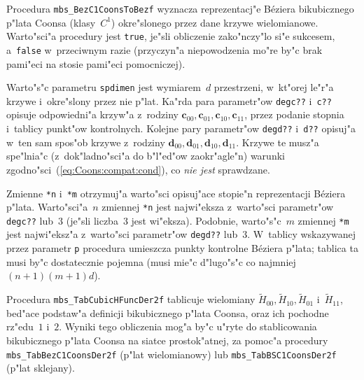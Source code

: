 \vspace{\bigskipamount}
Procedura \texttt{mbs\_BezC1CoonsToBezf} wyznacza reprezentacj"e B\'{e}ziera
bikubicznego p"lata Coonsa (klasy~$C^1$) okre"slonego przez dane krzywe
wielomianowe. Warto"sci"a procedury jest \texttt{true}, je"sli obliczenie
zako"nczy"lo si"e sukcesem, a~\texttt{false} w~przeciwnym razie (przyczyn"a
niepowodzenia mo"re by"c brak pami"eci na stosie pami"eci pomocniczej).

Warto"s"c parametru \texttt{spdimen} jest wymiarem~$d$ przestrzeni, w~kt"orej
le"r"a krzywe i~okre"slony przez nie p"lat. Ka"rda para parametr"ow
\texttt{degc??} i~\texttt{c??} opisuje odpowiedni"a krzyw"a z~rodziny
$\bm{c}_{00},\bm{c}_{01},\bm{c}_{10},\bm{c}_{11}$, przez podanie stopnia
i~tablicy punkt"ow kontrolnych. Kolejne pary parametr"ow \texttt{degd??}
i~\texttt{d??} opisuj"a w~ten sam spos"ob krzywe z~rodziny
$\bm{d}_{00},\bm{d}_{01},\bm{d}_{10},\bm{d}_{11}$. Krzywe te musz"a
spe"lnia"c (z~dok"ladno"sci"a do b"l"ed"ow zaokr"agle"n) warunki
zgodno"sci~(\ref{eq:Coons:compat:cond}), co \emph{nie jest} sprawdzane.

Zmienne \texttt{*n} i~\texttt{*m} otrzymuj"a warto"sci opisuj"ace stopie"n
reprezentacji B\'{e}ziera p"lata. Warto"sci"a~$n$ zmiennej \texttt{*n} jest
najwi"eksza z~warto"sci parametr"ow \texttt{degc??} lub~$3$ (je"sli liczba~$3$
jest wi"eksza). Podobnie, warto"s"c~$m$ zmiennej \texttt{*m} jest najwi"eksz"a
z~warto"sci parametr"ow \texttt{degd??} lub~$3$. W~tablicy wskazywanej przez
parametr \texttt{p} procedura umieszcza punkty kontrolne B\'{e}ziera p"lata;
tablica ta musi by"c dostatecznie pojemna (musi mie"c d"lugo"s"c co najmniej
$(n+1)(m+1)d$).

\vspace{\bigskipamount}
Procedura \texttt{mbs\_TabCubicHFuncDer2f} tablicuje wielomiany
$\tilde{H}_{00},\tilde{H}_{10},\tilde{H}_{01}$ i~$\tilde{H}_{11}$,
bed"ace podstaw"a definicji bikubicznego p"lata Coonsa, oraz ich pochodne
rz"edu~$1$ i~$2$. Wyniki tego obliczenia mog"a by"c u"ryte do stablicowania
bikubicznego p"lata Coonsa na siatce prostok"atnej, za pomoc"a procedury
\texttt{mbs\_TabBezC1CoonsDer2f} (p"lat wielomianowy) lub
\texttt{mbs\_TabBSC1CoonsDer2f} (p"lat sklejany).

